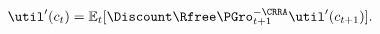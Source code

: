   \begin{equation}\begin{gathered}\begin{aligned}
    \util^{\prime}({c}_{t})  & = \Ex_{t}[\Discount\Rfree \PGro_{t+1}^{-\CRRA}\util^{\prime}({c}_{t+1})]. \label{eq:cEuler}
  \end{aligned}\end{gathered}\end{equation}
